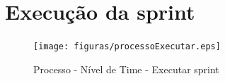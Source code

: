 \section{Execução da sprint}
\begin{figure}[H]
    \centering
    \label{identificarExecutar}
    \texttt{[image: figuras/processoExecutar.eps]}
    \caption[Executar sprint]{Processo - Nível de Time - Executar sprint}
\end{figure}
